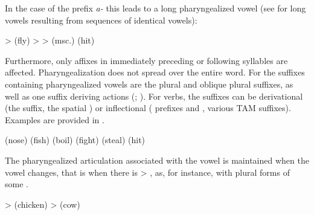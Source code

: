 In the case of the  prefix \textit{a-} this leads to a long pharyngealized vowel (see  for long vowels resulting from sequences of identical vowels):

\begin{exe}
	\ex	\label{ex:pharyngealization long vowel}
\begin{xlist}
\ex	{} >   (fly)
\ex	{} >  >   (msc.) (hit)
	\end{xlist}
\end{exe}	


Furthermore, only affixes in immediately preceding or following syllables are affected. Pharyngealization does not spread over the entire word. For  the suffixes containing pharyngealized vowels are the plural and oblique plural suffixes, as well as one suffix deriving actions  (; ). For verbs, the suffixes can be derivational (the  suffix, the spatial ) or inflectional ( prefixes  and , various TAM suffixes). Examples are provided in .
%
\begin{exe}
	\ex	\label{ex:pharyngealization spread phon}
\begin{xlist}
		\ex {}  (nose)	
		\ex {}  (fish)
		\ex {}  (boil)	
		\ex {}  (fight) 
		\ex {}  (steal)	
		\ex	{}  (hit)
\end{xlist}
\end{exe}

The pharyngealized articulation associated with the vowel is maintained when the vowel changes, that is when there is   > , as, for instance, with plural forms of some  .
%
\begin{exe}
	\ex	\label{ex:vowel mutation plural phon}
	\begin{xlist}
		\ex	{}  >   (chicken)
		\ex	{}  >   (cow)
	\end{xlist}
\end{exe}


